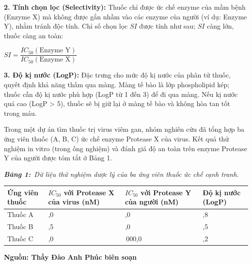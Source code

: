 \documentclass[12pt,a4paper,twoside]{article}
\newcommand{\tablecaption}[2]{%
    \par\vspace{2pt}%
    {\centering\textbf{\textit{Bảng #1:}}~\textit{#2}\par}%
    \vspace{0pt}%
}
\newenvironment{readingpassage}[1][]{%
    \begin{tcolorbox}[enhanced, colback=grayLight, colframe=secondaryBlue,
        coltitle=textDark, fonttitle=\bfseries, title={#1},
        rounded corners, arc=3mm, boxrule=1pt,
        left=15pt, right=15pt, top=10pt, bottom=10pt,
        breakable, before skip=10pt, after skip=10pt, drop fuzzy shadow]
    \setstretch{1.3}
}{\end{tcolorbox}}
\begin{document}
\begin{readingpassage}[]
\textbf{2. Tính chọn lọc (Selectivity):} Thuốc chỉ được ức chế enzyme của mầm bệnh (Enzyme X) mà không được gắn nhầm vào các enzyme của người (ví dụ: Enzyme Y), nhằm tránh độc tính. Chỉ số chọn lọc $SI$ được tính như sau; $SI$ càng lớn, thuốc càng an toàn:

\vspace{2pt}
\begin{center}
$SI = \dfrac{IC_{50}(\text{Enzyme Y})}{IC_{50}(\text{Enzyme X})}$
\end{center}
\vspace{2pt}

\textbf{3. Độ kị nước (LogP):} Đặc trưng cho mức độ kị nước của phân tử thuốc, quyết định khả năng thấm qua màng. Màng tế bào là lớp phospholipid kép; thuốc cần độ kị nước phù hợp (LogP từ 1 đến 3) để đi qua màng. Nếu kị nước quá cao (LogP > 5), thuốc sẽ bị giữ lại ở màng tế bào và không hòa tan tốt trong máu.

Trong một dự án tìm thuốc trị virus viêm gan, nhóm nghiên cứu đã tổng hợp ba ứng viên thuốc (A, B, C) ức chế enzyme Protease X của virus. Kết quả thử nghiệm in vitro (trong ống nghiệm) và đánh giá độ an toàn trên enzyme Protease Y của người được tóm tắt ở Bảng 1.

\vspace{6pt}

\tablecaption{1}{Dữ liệu thử nghiệm dược lý của ba ứng viên thuốc ức chế cạnh tranh.}
\renewcommand{\arraystretch}{1.4}
{\small
{}%
\begin{tabular}{|>{\raggedright\arraybackslash}m{}|>{\centering\arraybackslash}m{}|>{\centering\arraybackslash}m{}|>{\centering\arraybackslash}m{}|}
\hline
\rowcolor{primaryBlue!12}
\textbf{Ứng viên thuốc} & \textbf{$IC_{50}$ với Protease X của virus (nM)} & \textbf{$IC_{50}$ với Protease Y của người (nM)} & \textbf{Độ kị nước (LogP)} \\
\hline
Thuốc A & 5,0 & 50,0 & 1,8 \\
\hline
Thuốc B & 1,5 & 3,0 & 6,5 \\
\hline
Thuốc C & 20,0 & 10\,000,0 & 2,2 \\
\hline
\end{tabular}
}

\vspace{6pt}

\hfill\textbf{Nguồn: Thầy Đào Anh Phúc biên soạn}

\end{readingpassage}
\vspace{2pt}
\end{document}

